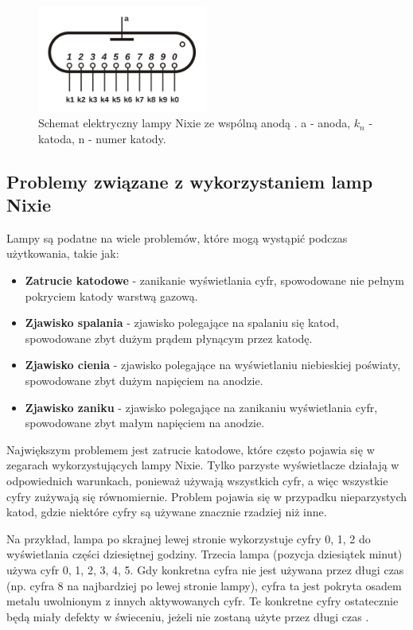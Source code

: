 \documentclass[../main.tex]{subfiles}
\begin{document}
\begin{figure}[H]
  \centering
  \includegraphics[width=0.5\textwidth]{Nixie_schematic.png}
  \caption{Schemat elektryczny lampy Nixie ze wspólną anodą \cite{st:nixie-jpg}. a - anoda, $k_{n}$ - katoda, n - numer katody.}
  \label{fig:nixie_schematic}
\end{figure}

\subsection{Problemy związane z wykorzystaniem lamp Nixie}

Lampy są podatne na wiele problemów, które mogą wystąpić podczas użytkowania, takie jak:
\begin{itemize}
  \item \textbf{Zatrucie katodowe} - zanikanie wyświetlania cyfr, spowodowane nie pełnym pokryciem katody warstwą gazową.
  \item \textbf{Zjawisko spalania} - zjawisko polegające na spalaniu się katod, spowodowane zbyt dużym prądem płynącym przez katodę.
  \item \textbf{Zjawisko cienia} - zjawisko polegające na wyświetlaniu niebieskiej poświaty, spowodowane zbyt dużym napięciem na anodzie.
  \item \textbf{Zjawisko zaniku} - zjawisko polegające na zanikaniu wyświetlania cyfr, spowodowane zbyt małym napięciem na anodzie.
\end{itemize}

Największym problemem jest zatrucie katodowe, które często pojawia się w zegarach wykorzystujących lampy Nixie.
Tylko parzyste wyświetlacze działają w odpowiednich warunkach, ponieważ używają wszystkich cyfr, 
a więc wszystkie cyfry zużywają się równomiernie.
Problem pojawia się w przypadku nieparzystych katod, gdzie niektóre cyfry są używane znacznie rzadziej niż inne.

Na przykład, lampa po skrajnej lewej stronie wykorzystuje cyfry 0, 1, 2 do wyświetlania części dziesiętnej godziny.
Trzecia lampa (pozycja dziesiątek minut) używa cyfr 0, 1, 2, 3, 4, 5. Gdy konkretna cyfra nie jest używana przez długi czas
 (np. cyfra 8 na najbardziej po lewej stronie lampy),
cyfra ta jest pokryta osadem metalu uwolnionym z innych aktywowanych cyfr.
 Te konkretne cyfry ostatecznie będą miały defekty w świeceniu, jeżeli nie zostaną użyte przez długi czas \cite{st:nixie1}.
\end{document}
